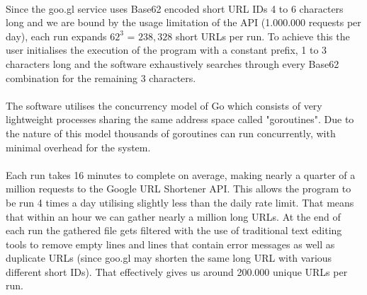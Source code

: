 \documentclass[12pt]{article}
\begin{document}
\paragraph{}
Since the goo.gl service uses Base62 encoded short URL IDs 4 to 6 characters long and we are bound by the usage limitation of the API (1.000.000 requests per day), each run expands $62^{3}$ = $238,328$ short URLs per run. To achieve this the user initialises the execution of the program with a constant prefix, 1 to 3 characters long and the software exhaustively searches through every Base62 combination for the remaining 3 characters.

\paragraph{}
The software utilises the concurrency model of Go which consists of very lightweight processes sharing the same address space called "goroutines". Due to the nature of this model thousands of goroutines can run concurrently, with minimal overhead for the system. 

\paragraph{}
Each run takes 16 minutes to complete on average, making nearly a quarter of a million requests to the Google URL Shortener API. This allows the program to be run 4 times a day utilising slightly less than the daily rate limit. That means that within an hour we can gather nearly a million long URLs. At the end of each run the gathered file gets filtered with the use of traditional text editing tools to remove empty lines and lines that contain error messages as well as duplicate URLs (since goo.gl may shorten the same long URL with various different short IDs). That effectively gives us around 200.000 unique URLs per run. 
\end{document}
